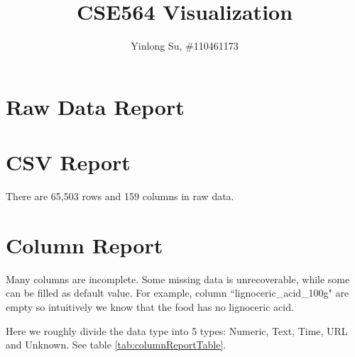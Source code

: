 \documentclass[11pt]{article}
\begin{document}
\title{CSE564 Visualization}
\author{Yinlong Su, \#110461173}
\maketitle

\section*{Raw Data Report}

\section{CSV Report}

There are 65,503 rows and 159 columns in raw data.

\section{Column Report}

Many columns are incomplete. Some missing data is unrecoverable, while some can be filled as default value. For example, column ``lignoceric\_acid\_100g" are empty so intuitively we know that the food has no lignoceric acid.
\par
Here we roughly divide the data type into 5 types: Numeric, Text, Time, URL and Unknown. See table \ref{tab:columnReportTable}.
\par
\end{document}
